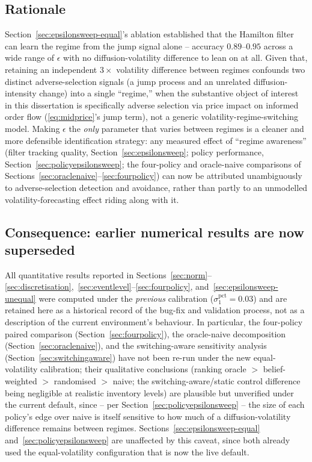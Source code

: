 \documentclass[11pt]{article}
\begin{document}
\subsection{Rationale}
Section~\ref{sec:epsilonsweep-equal}'s ablation established that the Hamilton filter can learn the regime from the jump signal alone -- accuracy $0.89$--$0.95$ across a wide range of $\epsilon$ with no diffusion-volatility difference to lean on at all. Given that, retaining an independent $3\times$ volatility difference between regimes confounds two distinct adverse-selection signals (a jump process and an unrelated diffusion-intensity change) into a single ``regime,'' when the substantive object of interest in this dissertation is specifically adverse selection via price impact on informed order flow (\eqref{eq:midprice}'s jump term), not a generic volatility-regime-switching model. Making $\epsilon$ the \emph{only} parameter that varies between regimes is a cleaner and more defensible identification strategy: any measured effect of ``regime awareness'' (filter tracking quality, Section~\ref{sec:epsilonsweep}; policy performance, Section~\ref{sec:policyepsilonsweep}; the four-policy and oracle-naive comparisons of Sections~\ref{sec:oraclenaive}--\ref{sec:fourpolicy}) can now be attributed unambiguously to adverse-selection detection and avoidance, rather than partly to an unmodelled volatility-forecasting effect riding along with it.

\subsection{Consequence: earlier numerical results are now superseded}
\label{sec:equalvolrecal-stale}
All quantitative results reported in Sections~\ref{sec:norm}--\ref{sec:discretisation},~\ref{sec:eventlevel}--\ref{sec:fourpolicy}, and~\ref{sec:epsilonsweep-unequal} were computed under the \emph{previous} calibration ($\sigma_1^{\text{pct}}=0.03$) and are retained here as a historical record of the bug-fix and validation process, not as a description of the current environment's behaviour. In particular, the four-policy paired comparison (Section~\ref{sec:fourpolicy}), the oracle-naive decomposition (Section~\ref{sec:oraclenaive}), and the switching-aware sensitivity analysis (Section~\ref{sec:switchingaware}) have not been re-run under the new equal-volatility calibration; their qualitative conclusions (ranking oracle $>$ belief-weighted $>$ randomised $>$ naive; the switching-aware/static control difference being negligible at realistic inventory levels) are plausible but unverified under the current default, since -- per Section~\ref{sec:policyepsilonsweep} -- the size of each policy's edge over naive is itself sensitive to how much of a diffusion-volatility difference remains between regimes. Sections~\ref{sec:epsilonsweep-equal} and~\ref{sec:policyepsilonsweep} are unaffected by this caveat, since both already used the equal-volatility configuration that is now the live default.
\end{document}

